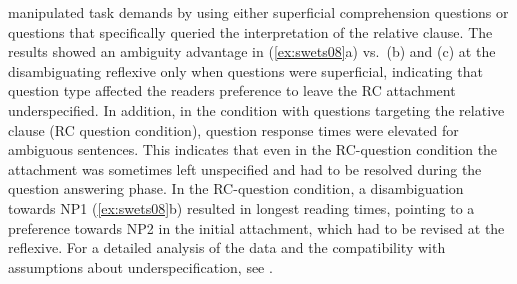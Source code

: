 \documentclass{cambridge7A}\usepackage[]{graphicx}\usepackage[]{color}
\begin{document}
\cite{SwetsDesmetClifton2008} manipulated task demands by using either superficial comprehension questions or questions that specifically queried the interpretation of the relative clause. The results showed an ambiguity advantage in (\ref{ex:swets08}a) vs.\ (b) and (c) at the disambiguating reflexive only when questions were superficial, indicating that question type affected the readers preference to leave the RC attachment underspecified. 
In addition, in the condition with questions targeting the relative clause (RC question condition), question response times were elevated for ambiguous sentences. This indicates that even in the RC-question condition the attachment was sometimes left unspecified and had to be resolved during the question answering phase. In the RC-question condition, a disambiguation towards NP1 (\ref{ex:swets08}b) resulted in longest reading times, pointing to a preference towards NP2 in the initial attachment, which had to be revised at the reflexive. For a detailed analysis of the \cite{SwetsDesmetClifton2008} data and the compatibility with assumptions about underspecification, see \cite{LogacevMultiple,LogacevVasishthQJEP2016}.


\end{document}
